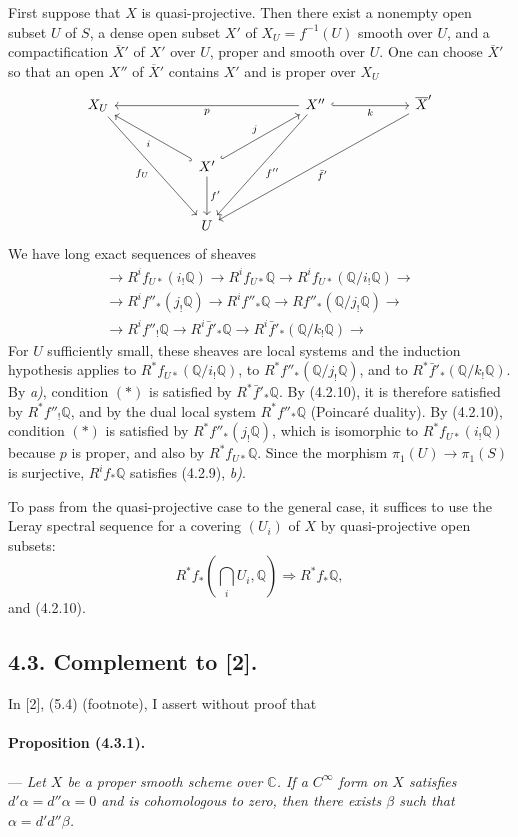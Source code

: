 \documentclass[10pt]{article}
\newcommand{\C}{\mathbb C}
\newcommand{\Q}{\mathbb Q}
\begin{document}
First suppose that $X$ is quasi-projective. Then there exist a nonempty open subset $U$ of $S$, a dense open subset $X'$ of $X_U=f^{-1}(U)$ smooth over $U$, and a compactification $\overline X'$ of $X'$ over $U$, proper and smooth over $U$. One can choose $\overline X'$ so that an open $X''$ of $\overline X'$ contains $X'$ and is proper over $X_U$
\[
\begin{tikzcd}[column sep=2.8em,row sep=2.8em]
X_U \arrow[ddrr,"f_U"'] &&&&
X'' \arrow[llll,"p"] \arrow[rr,hook,"k"'] \arrow[ddll,"f''"] &&
\overline X' \arrow[ddllll,"\bar f'"] \\
&& X' \arrow[ull,hook,"i"] \arrow[urr,hook,"j"] \arrow[d,"f'"] &&&& \\
&& U &&&&
\end{tikzcd}
\]
We have long exact sequences of sheaves
\[
\begin{gathered}
\to R^if_{U*}(i_!\Q)\to R^if_{U*}\Q\to R^if_{U*}(\Q/i_!\Q)\to\\
\to R^if''_*(j_!\Q)\to R^if''_*\Q\to Rf''_*(\Q/j_!\Q)\to\\
\to R^if''_!\Q\to R^i\bar f'_*\Q\to R^i\bar f'_*(\Q/k_!\Q)\to
\end{gathered}
\]
For $U$ sufficiently small, these sheaves are local systems and the induction hypothesis applies to $R^*f_{U*}(\Q/i_!\Q)$, to $R^*f''_*(\Q/j_!\Q)$, and to $R^*\bar f'_*(\Q/k_!\Q)$. By \textit{a)}, condition $(*)$ is satisfied by $R^*\bar f'_*\Q$. By (4.2.10), it is therefore satisfied by $R^*f''_!\Q$, and by the dual local system $R^*f''_*\Q$ (Poincaré duality). By (4.2.10), condition $(*)$ is satisfied by $R^*f''_*(j_!\Q)$, which is isomorphic to $R^*f_{U*}(i_!\Q)$ because $p$ is proper, and also by $R^*f_{U*}\Q$. Since the morphism $\pi_1(U)\to\pi_1(S)$ is surjective, $R^if_*\Q$ satisfies (4.2.9), \textit{b)}.

To pass from the quasi-projective case to the general case, it suffices to use the Leray spectral sequence for a covering $(U_i)$ of $X$ by quasi-projective open subsets:
\[
R^*f_*(\bigcap_i U_i,\Q)\Rightarrow R^*f_*\Q,
\]
and (4.2.10).

\subsection*{4.3. Complement to [2].}

In [2], (5.4) (footnote), I assert without proof that

\paragraph{Proposition (4.3.1).} --- {\itshape Let $X$ be a proper smooth scheme over $\C$. If a $C^\infty$ form on $X$ satisfies $d'\alpha=d''\alpha=0$ and is cohomologous to zero, then there exists $\beta$ such that $\alpha=d'd''\beta$.}
\end{document}
